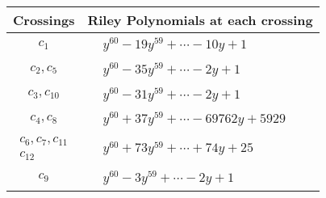 \documentclass[1p]{elsarticle_modified}
\theoremstyle{definition}
\begin{document}
\begin{tabular}{m{50pt}|m{274pt}}
Crossings & \hspace{64pt}Riley Polynomials at each crossing \\
\hline $$\begin{aligned}c_{1}\end{aligned}$$&$\begin{aligned}
&y^{60}-19 y^{59}+\cdots-10 y+1
\end{aligned}$\\
\hline $$\begin{aligned}c_{2},c_{5}\end{aligned}$$&$\begin{aligned}
&y^{60}-35 y^{59}+\cdots-2 y+1
\end{aligned}$\\
\hline $$\begin{aligned}c_{3},c_{10}\end{aligned}$$&$\begin{aligned}
&y^{60}-31 y^{59}+\cdots-2 y+1
\end{aligned}$\\
\hline $$\begin{aligned}c_{4},c_{8}\end{aligned}$$&$\begin{aligned}
&y^{60}+37 y^{59}+\cdots-69762 y+5929
\end{aligned}$\\
\hline $$\begin{aligned}c_{6},c_{7},c_{11}\\c_{12}\end{aligned}$$&$\begin{aligned}
&y^{60}+73 y^{59}+\cdots+74 y+25
\end{aligned}$\\
\hline $$\begin{aligned}c_{9}\end{aligned}$$&$\begin{aligned}
&y^{60}-3 y^{59}+\cdots-2 y+1
\end{aligned}$\\
\hline
\end{tabular}
\vskip 2pc
\end{document}
